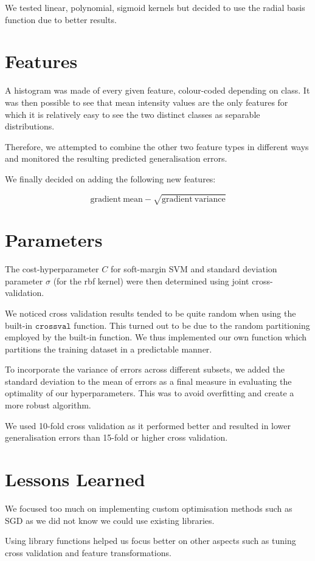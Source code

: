 \documentclass[a4paper, 11pt]{article}
\begin{document}
We tested linear, polynomial, sigmoid kernels but decided to use the radial
basis function due to better results.


\section{Features}
A histogram was made of every given feature, colour-coded depending on class. It
was then possible to see that mean intensity values are the only features for
which it is relatively easy to see the two distinct classes as separable
distributions.

Therefore, we attempted to combine the other two feature types in different ways
and monitored the resulting predicted generalisation errors.

We finally decided on adding the following new features:

\begin{equation}
	\mathrm{gradient\ mean} - \sqrt{\mathrm{gradient\ variance}}
\end{equation}


\section{Parameters}
The cost-hyperparameter $C$ for soft-margin SVM and standard deviation parameter
$\sigma$ (for the rbf kernel) were then determined using joint cross-validation.

We noticed cross validation results tended to be quite random when using the
built-in $\mathtt{crossval}$ function. This turned out to be due to the random
partitioning employed by the built-in function. We thus implemented our own
function which partitions the training dataset in a predictable manner.

To incorporate the variance of errors across different subsets, we added the
standard deviation to the mean of errors as a final measure in evaluating
the optimality of our hyperparameters. This was to avoid overfitting and create
a more robust algorithm.

We used 10-fold cross validation as it performed better and resulted in lower
generalisation errors than 15-fold or higher cross validation.


\section{Lessons Learned}
We focused too much on implementing custom optimisation methods such as SGD as
we did not know we could use existing libraries.

Using library functions helped us focus better on other aspects such as tuning
cross validation and feature transformations.
\end{document}
